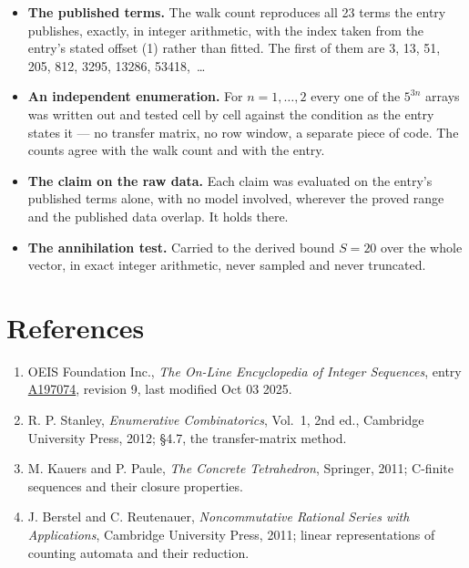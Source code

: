 \documentclass[11pt]{article}
\theoremstyle{definition}
\begin{document}
\begin{itemize}

\item {\bfseries The published terms.} The walk count reproduces all 23 terms the entry publishes, exactly, in integer arithmetic, with the index taken from the entry's stated offset (1) rather than fitted. The first of them are 3, 13, 51, 205, 812, 3295, 13286, 53418,~\dots

\item {\bfseries An independent enumeration.} For $n = 1,\dots,2$ every one of the $5^{3n}$ arrays was written out and tested cell by cell against the condition as the entry states it --- no transfer matrix, no row window, a separate piece of code. The counts agree with the walk count and with the entry.

\item {\bfseries The claim on the raw data.} Each claim was evaluated on the entry's published terms alone, with no model involved, wherever the proved range and the published data overlap. It holds there.

\item {\bfseries The annihilation test.} Carried to the derived bound $S = 20$ over the whole vector, in exact integer arithmetic, never sampled and never truncated.

\end{itemize}

\section{References}

\begin{enumerate}

\item OEIS Foundation Inc., \emph{The On-Line Encyclopedia of Integer Sequences}, entry \href{https://oeis.org/A197074}{A197074}, revision 9, last modified Oct 03 2025.

\item R. P. Stanley, \emph{Enumerative Combinatorics}, Vol.~1, 2nd ed., Cambridge University Press, 2012; \S4.7, the transfer-matrix method.

\item M. Kauers and P. Paule, \emph{The Concrete Tetrahedron}, Springer, 2011; C-finite sequences and their closure properties.

\item J. Berstel and C. Reutenauer, \emph{Noncommutative Rational Series with Applications}, Cambridge University Press, 2011; linear representations of counting automata and their reduction.

\end{enumerate}
\end{document}
